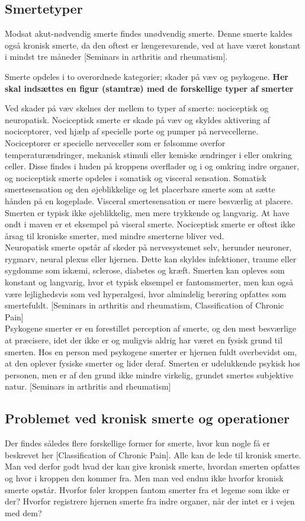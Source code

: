 \subsection{Smertetyper}
Modsat akut-nødvendig smerte findes unødvendig smerte. Denne smerte kaldes også kronisk smerte, da den oftest er længerevarende, ved at have været konstant i mindst tre måneder [Seminars in arthritis and rheumatism]. 

Smerte opdeles i to overordnede kategorier; skader på væv og psykogene.
\textbf{Her skal indsættes en figur (stamtræ) med de forskellige typer af smerter} 

Ved skader på væv skelnes der mellem to typer af smerte: nociceptisk og neuropatisk. Nociceptisk smerte er skade på væv og skyldes aktivering af nociceptorer, ved hjælp af specielle porte og pumper på nervecellerne. Nociceptorer er specielle nerveceller som er følsomme overfor temperaturændringer, mekanisk stimuli eller kemiske ændringer i eller omkring celler. Disse findes i huden på kroppens overflader og i og omkring indre organer, og nociceptisk smerte opdeles i somatisk og visceral sensation. Somatisk smertesensation og den øjeblikkelige og let placerbare smerte som at sætte hånden på en kogeplade. Visceral smertesensation er mere besværlig at placere. Smerten er typisk ikke øjeblikkelig, men mere trykkende og langvarig. At have ondt i maven er et eksempel på viseral smerte. Nociceptisk smerte er oftest ikke årsag til kroniske smerter, med mindre smerterne bliver ved.\\ 
Neuropatisk smerte opstår af skeder på nervesystemet selv, herunder neuroner, rygmarv, neural plexus eller hjernen. Dette kan skyldes infektioner, traume eller sygdomme som iskæmi, sclerose, diabetes og kræft. Smerten kan opleves som konstant og langvarig, hvor et typisk eksempel er fantomsmerter, men kan også være lejlighedsvis som ved hyperalgesi, hvor almindelig berøring opfattes som smertefuldt. [Seminars in arthritis and rheumatism, Classification of Chronic Pain]\\
Psykogene smerter er en forestillet perception af smerte, og den mest besværlige at præcisere, idet der ikke er og muligvis aldrig har været en fysisk grund til smerten. Hos en person med psykogene smerter er hjernen fuldt overbevidst om, at den oplever fysiske smerter og lider deraf. Smerten er udelukkende psykisk hos personen, men er af den grund ikke mindre virkelig, grundet smertes subjektive natur. [Seminars in arthritis and rheumatism]

\subsection{Problemet ved kronisk smerte og operationer}
Der findes således flere forskellige former for smerte, hvor kun nogle få er beskrevet her [Classification of Chronic Pain]. Alle kan de lede til kronisk smerte. Man ved derfor godt hvad der kan give kronisk smerte, hvordan smerten opfattes og hvor i kroppen den kommer fra. Men man ved endnu ikke hvorfor kronisk smerte opstår. Hvorfor føler kroppen fantom smerter fra et legeme som ikke er der? Hvorfor registrere hjernen smerte fra indre organer, når der intet er i vejen med dem? 



